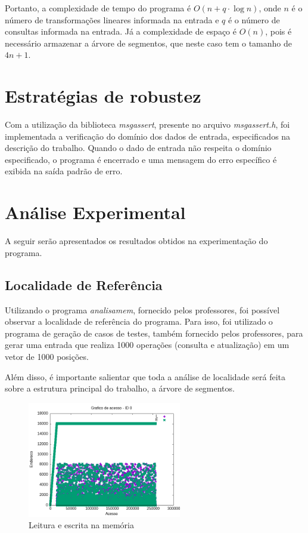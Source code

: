 \documentclass{article}
\begin{document}
Portanto, a complexidade de tempo do programa é $O(n + q \cdot \log n)$, onde $n$ é o número de transformações lineares informada na entrada e $q$ é o número de consultas informada na entrada.
Já a complexidade de espaço é $O(n)$, pois é necessário armazenar a árvore de segmentos, que neste caso tem o tamanho de $4n + 1$.

\section{Estratégias de robustez}
Com a utilização da biblioteca \emph{msgassert}, presente no arquivo \emph{msgassert.h}, foi implementada a verificação do domínio dos dados de entrada, especificados na descrição do trabalho. 
Quando o dado de entrada não respeita o domínio especificado, o programa é encerrado e uma mensagem do erro específico é exibida na saída padrão de erro.

\section{Análise Experimental}

A seguir serão apresentados os resultados obtidos na experimentação do programa.

\subsection{Localidade de Referência}

Utilizando o programa \emph{analisamem}, fornecido pelos professores, foi possível observar a localidade de referência do programa. 
Para isso, foi utilizado o programa de geração de casos de testes, também fornecido pelos professores, para gerar uma entrada que realiza 1000 operações (consulta e atualização) em um vetor de 1000 posições.

Além disso, é importante salientar que toda a análise de localidade será feita sobre a estrutura principal do trabalho, a árvore de segmentos.

\begin{figure}[H]
    \centering
    \includegraphics[width=0.6\textwidth]{./images/registro-acesso-0.png}
    \caption{Leitura e escrita na memória}
    \label{fig:ac01}
\end{figure}
\end{document}
